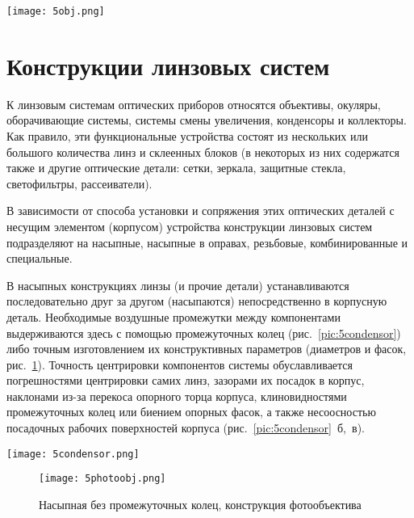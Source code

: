 \begin{figure*}[h!]	
	\texttt{[image: 5obj.png]}
	\caption{ Проекционный объектив }
	\label{pic:5obj}
\end{figure*}

\section{Конструкции линзовых систем}

К линзовым системам оптических приборов относятся объективы, окуляры, оборачивающие системы, системы смены увеличения, конденсоры и коллекторы. Как правило, эти функциональные устройства состоят из нескольких или большого количества линз и склеенных блоков (в некоторых из них содержатся также и другие оптические детали: сетки, зеркала, защитные стекла, светофильтры, рассеиватели).

В зависимости от способа установки и сопряжения этих оптических деталей с несущим элементом (корпусом) устройства конструкции линзовых систем подразделяют на насыпные, насыпные в оправах, резьбовые, комбинированные и специальные. 

В насыпных конструкциях линзы (и прочие детали) устанавливаются последовательно друг за другом (насыпаются) непосредственно в корпусную деталь. Необходимые воздушные промежутки между компонентами выдерживаются здесь с помощью промежуточных колец (рис.~\ref{pic:5condensor}) либо точным изготовлением их конструктивных параметров (диаметров и фасок, рис.~\ref{pic:5photoobj}). Точность центрировки компонентов системы обуславливается погрешностями центрировки самих линз, зазорами их посадок в корпус, наклонами из-за перекоса опорного торца корпуса, клиновидностями промежуточных колец или биением опорных фасок, а также несоосностью посадочных рабочих поверхностей корпуса (рис.~\ref{pic:5condensor}~б,~в).

\begin{figure*}[h!]
	\begin{center}
		\texttt{[image: 5condensor.png]}
		\caption{ Насыпные с промежуточными кольцами конструкции конденсоров }
		\label{pic:5condensor}
	\end{center}
\end{figure*}

\begin{figure}[h!]
	\begin{center}
		\texttt{[image: 5photoobj.png]}
		\caption{ Насыпная без промежуточных колец, конструкция фотообъектива }
		\label{pic:5photoobj}
	\end{center}
\end{figure}

